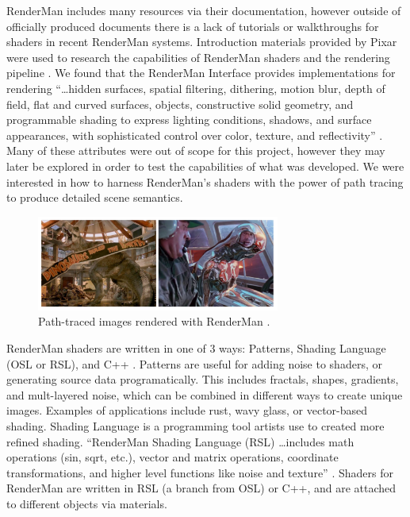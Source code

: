 \documentclass[conference]{IEEEtran}
\begin{document}
RenderMan includes many resources via their documentation,
however outside of officially produced documents there is a lack of tutorials or
walkthroughs for shaders in recent RenderMan systems.
Introduction materials provided by Pixar were used to research the capabilities
of RenderMan shaders and the rendering pipeline \cite{renderman}.
We found that the RenderMan Interface provides implementations for rendering
``\dots hidden surfaces, spatial filtering, dithering, motion blur, depth of field,
flat and curved surfaces, objects, constructive solid geometry,
and programmable shading to express lighting conditions, shadows, and surface appearances,
with sophisticated control over color, texture, and reflectivity''
\cite{renderman_docs}.
Many of these attributes were out of scope
for this project, however they may later be explored in order to test the capabilities
of what was developed.
We were interested in how to harness RenderMan's shaders with the power of path tracing
to produce detailed scene semantics.

\begin{figure}[htbp]
\centerline{\includegraphics[width=8cm]{renderman.png}}
\caption{Path-traced images rendered with RenderMan \cite{renderman}.}
\label{fig:renderman}
\end{figure}

RenderMan shaders are written in one of 3 ways:
Patterns, Shading Language (OSL or RSL), and C++ \cite{shading}.
Patterns are useful for adding noise to shaders, or generating source data
programatically. This includes fractals, shapes, gradients, and mult-layered noise,
which can be combined in different ways to create unique images.
Examples of applications include rust, wavy glass, or vector-based shading.
Shading Language is a programming tool artists use to created more refined shading.
``RenderMan Shading Language (RSL) \dots includes math operations (sin, sqrt, etc.),
vector and matrix operations, coordinate transformations, and higher level functions like noise and texture''
\cite{renderman_docs}.
Shaders for RenderMan are written in RSL (a branch from OSL) or C++,
and are attached to different objects via materials.
\end{document}
